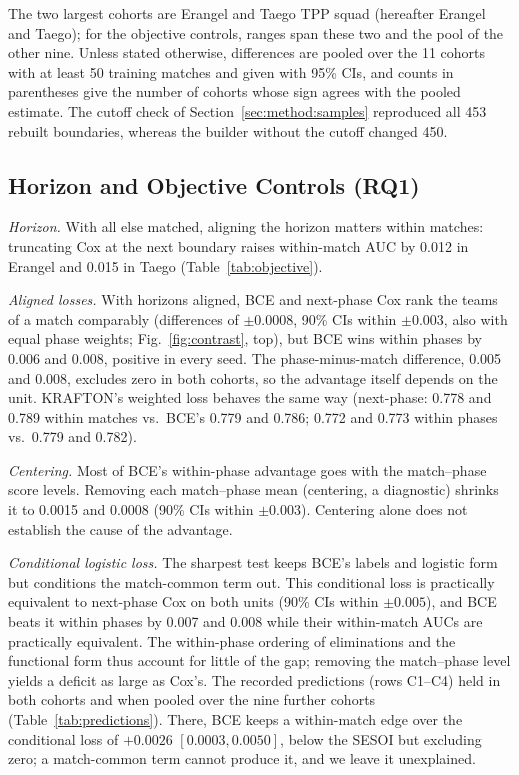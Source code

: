 \documentclass[sigconf,anonymous]{acmart}
\begin{document}
The two largest cohorts are Erangel and Taego TPP squad (hereafter Erangel and Taego); for the objective controls, ranges span these two and the pool of the other nine. Unless stated otherwise, differences are pooled over the 11 cohorts with at least 50 training matches and given with 95\% CIs, and counts in parentheses give the number of cohorts whose sign agrees with the pooled estimate. The cutoff check of Section~\ref{sec:method:samples} reproduced all 453 rebuilt boundaries, whereas the builder without the cutoff changed 450.

\subsection{Horizon and Objective Controls (RQ1)}
\label{sec:results:rq1}
\emph{Horizon.} With all else matched, aligning the horizon matters within matches: truncating Cox at the next boundary raises within-match AUC by 0.012 in Erangel and 0.015 in Taego (Table~\ref{tab:objective}).

\emph{Aligned losses.} With horizons aligned, BCE and next-phase Cox rank the teams of a match comparably (differences of $\pm0.0008$, 90\% CIs within $\pm0.003$, also with equal phase weights; Fig.~\ref{fig:contrast}, top), but BCE wins within phases by 0.006 and 0.008, positive in every seed. The phase-minus-match difference, 0.005 and 0.008, excludes zero in both cohorts, so the advantage itself depends on the unit. KRAFTON's weighted loss behaves the same way (next-phase: 0.778 and 0.789 within matches vs.\ BCE's 0.779 and 0.786; 0.772 and 0.773 within phases vs.\ 0.779 and 0.782).

\emph{Centering.} Most of BCE's within-phase advantage goes with the match--phase score levels. Removing each match--phase mean (centering, a diagnostic) shrinks it to 0.0015 and 0.0008 (90\% CIs within $\pm0.003$). Centering alone does not establish the cause of the advantage.

\emph{Conditional logistic loss.} The sharpest test keeps BCE's labels and logistic form but conditions the match-common term out. This conditional loss is practically equivalent to next-phase Cox on both units (90\% CIs within $\pm0.005$), and BCE beats it within phases by 0.007 and 0.008 while their within-match AUCs are practically equivalent. The within-phase ordering of eliminations and the functional form thus account for little of the gap; removing the match--phase level yields a deficit as large as Cox's. The recorded predictions (rows C1--C4) held in both cohorts and when pooled over the nine further cohorts (Table~\ref{tab:predictions}). There, BCE keeps a within-match edge over the conditional loss of $+0.0026$ $[0.0003,\allowbreak 0.0050]$, below the SESOI but excluding zero; a match-common term cannot produce it, and we leave it unexplained.
\end{document}
